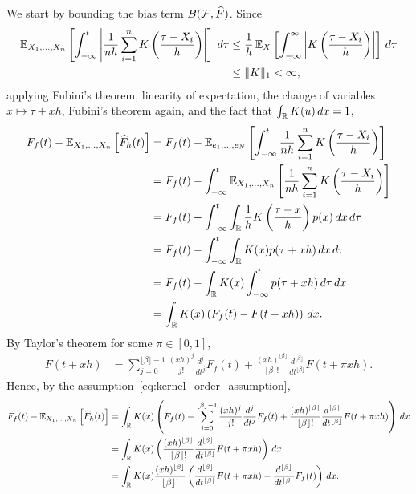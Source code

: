 \documentclass{article}
\begin{document}
We start by bounding the bias term $B(\mathcal{F}, \widehat F)$. Since
\begin{align*}
    \operatorname{\mathbb{E}}_{X_1,...,X_n} \left[ \int_{-\infty}^t \left| \frac{1}{nh} \sum_{i = 1}^n K \left( \frac{\tau - X_i}{h} \right) \right| \right] \, d\tau
      & \leq \frac{1}{h} \operatorname{\mathbb{E}}_X \left[ \int_{-\infty}^\infty \left| K \left( \frac{\tau - X_i}{h} \right) \right| \right] \, d\tau \\
      & \leq \|K\|_1 < \infty,
\end{align*}
applying Fubini's theorem, linearity of expectation, the change of variables $x \mapsto \tau + xh$, Fubini's theorem again, and the fact that $\int_{\mathbb{R}} K(u) \, dx = 1$,
\begin{align*}
    F_f(t) - \operatorname{\mathbb{E}}_{X_1,...,X_n} \left[ \widehat F_h(t) \right]
    & = F_f(t) - \operatorname{\mathbb{E}}_{e_1,...,e_N} \left[ \int_{-\infty}^t \frac{1}{nh} \sum_{i = 1}^n K \left( \frac{\tau - X_i}{h} \right) \right] \\
    & = F_f(t) - \int_{-\infty}^t \operatorname{\mathbb{E}}_{X_1,...,X_n} \left[ \frac{1}{nh} \sum_{i = 1}^n K \left( \frac{\tau - X_i}{h} \right) \right] \\
    & = F_f(t) - \int_{-\infty}^t \int_{\mathbb{R}} \frac{1}{h} K \left( \frac{\tau - x}{h} \right) p(x) \, dx \, d\tau \\
    & = F_f(t) - \int_{-\infty}^t \int_{\mathbb{R}} K(x) p(\tau + xh) \, dx \, d\tau \\
    & = F_f(t) - \int_{\mathbb{R}} K(x) \int_{-\infty}^t p(\tau + xh) \, d\tau \, dx \\
    & = \int_{\mathbb{R}} K(x) \left( F_f(t) - F(t + xh) \right) \, dx.
\end{align*}
By Taylor's theorem for some $\pi \in [0, 1]$,
\begin{align*}
    F(t + xh)
    & = \sum_{j = 0}^{\lfloor \beta \rfloor - 1} \frac{(xh)^j}{j!} \frac{d^j}{dt^j} F_f(t)
      + \frac{(xh)^{\lfloor \beta \rfloor}}{\lfloor \beta \rfloor!} \frac{d^{\lfloor \beta \rfloor}}{dt^{\lfloor \beta \rfloor}} F(t + \pi xh).
\end{align*}
Hence, by the assumption~\eqref{eq:kernel_order_assumption},
\begin{align*}
    F_f(t) - \operatorname{\mathbb{E}}_{X_1,...,X_n} \left[ \widehat F_h(t) \right]
    & = \int_{\mathbb{R}} K(x) \left( F_f(t) - \sum_{j = 0}^{\lfloor \beta \rfloor - 1} \frac{(xh)^j}{j!} \frac{d^j}{dt^j} F_f(t)
      + \frac{(xh)^{\lfloor \beta \rfloor}}{\lfloor \beta \rfloor!} \frac{d^{\lfloor \beta \rfloor}}{dt^{\lfloor \beta \rfloor}} F(t + \pi xh) \right) \, dx \\
    & = \int_{\mathbb{R}} K(x) \left( \frac{(xh)^{\lfloor \beta \rfloor}}{\lfloor \beta \rfloor!} \frac{d^{\lfloor \beta \rfloor}}{dt^{\lfloor \beta \rfloor}} F(t + \pi xh) \right) \, dx \\
    & = \int_{\mathbb{R}} K(x) \frac{(xh)^{\lfloor \beta \rfloor}}{\lfloor \beta \rfloor!} \left( \frac{d^{\lfloor \beta \rfloor}}{dt^{\lfloor \beta \rfloor}} F(t + \pi xh) - \frac{d^{\lfloor \beta \rfloor}}{dt^{\lfloor \beta \rfloor}} F_f(t) \right) \, dx.
\end{align*}
\end{document}

